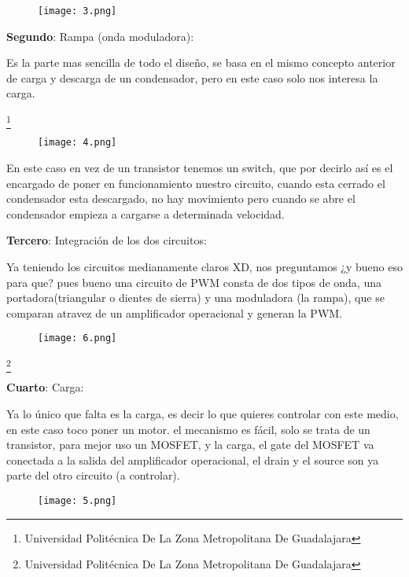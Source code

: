 \documentclass[11pt,a4paper]{article}
\begin{document}
\begin{figure}[hbtp]
\centering
\texttt{[image: 3.png]}
\end{figure} 

\textbf{Segundo}: Rampa (onda moduladora):

Es la parte mas sencilla de todo el diseño, se basa en el mismo concepto anterior de carga y descarga de un condensador, pero en este caso solo nos interesa la carga. 

\footnote{Universidad Politécnica De La Zona Metropolitana De Guadalajara} 

\newpage

\begin{figure}[hbtp]
\centering
\texttt{[image: 4.png]}
\end{figure} 

En este caso en vez de un transistor tenemos un switch, que por decirlo así es el encargado de poner en funcionamiento nuestro circuito, cuando esta cerrado el condensador esta descargado, no hay movimiento pero cuando se abre el condensador empieza a cargarse a determinada velocidad. 

\textbf{Tercero}: Integración de los dos circuitos:

Ya teniendo los circuitos medianamente claros XD, nos preguntamos ¿y bueno eso para que? pues bueno una circuito de PWM consta de dos tipos de onda, una portadora(triangular o dientes de sierra) y una moduladora (la rampa), que se comparan atravez de un amplificador operacional y generan la PWM. 

\begin{figure}[hbtp]
\centering
\texttt{[image: 6.png]}
\end{figure} 

\footnote{Universidad Politécnica De La Zona Metropolitana De Guadalajara} 

\newpage

\textbf{Cuarto}: Carga:

Ya lo único que falta es la carga, es decir lo que quieres controlar con este medio, en este caso toco poner un motor. el mecanismo es fácil, solo se trata de un transistor, para mejor uso un MOSFET, y la carga, el gate del MOSFET va conectada a la salida del amplificador operacional, el drain y el source son ya parte del otro circuito (a controlar).

\begin{figure}[hbtp]
\centering
\texttt{[image: 5.png]}
\end{figure} 
\end{document}

